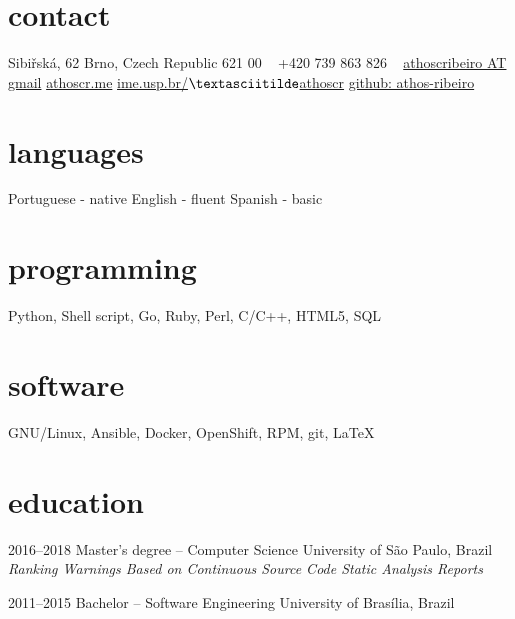 \documentclass[print]{friggeri-cv}
\begin{document}


\begin{aside} %
\section{contact}
Sibiřská, 62
Brno, Czech Republic
621 00
~
+420 739 863 826
~
\href{mailto:athoscribeiro@gmail.com}{athoscribeiro AT gmail}
\href{http://athoscr.me}{athoscr.me}
\href{https://www.ime.usp.br/~athoscr}{ime.usp.br/$\textasciitilde$athoscr}
\href{https://github.com/athos-ribeiro}{github: athos-ribeiro}
\section{languages}
Portuguese - native
English - fluent
Spanish - basic
\section{programming}
Python, Shell script, Go, Ruby, Perl, C/C++, HTML5, SQL
\section{software}
GNU/Linux, Ansible, Docker, OpenShift, RPM, git, \LaTeX
\end{aside}


\section{education}

\begin{entrylist}


\entry
{2016--2018}
{Master's degree -- {\normalfont Computer Science}}
{University of São Paulo, Brazil}
  {\emph{Ranking Warnings Based on Continuous Source Code Static Analysis Reports}}


\entry
{2011--2015}
{Bachelor -- {\normalfont Software Engineering}}
{University of Brasília, Brazil}


\end{entrylist}
\end{document}
